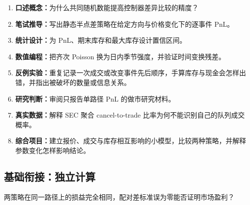 \begin{enumerate}[leftmargin=*]
  \item \textbf{口述概念：}为什么共同随机数能提高控制器差异比较的精度？
  \item \textbf{笔试推导：}写出静态半点差策略在给定方向与价格变化下的逐事件 PnL。
  \item \textbf{统计设计：}为 PnL、期末库存和最大库存设计置信区间。
  \item \textbf{数值编程：}把齐次 Poisson 换为日内季节强度，并验证时间变换残差。
  \item \textbf{反例实验：}重复记录一次成交或改变事件先后顺序，手算库存与现金会怎样出错，并指出被破坏的数量或信息关系。
  \item \textbf{研究判断：}审阅只报告单路径 PnL 的做市研究材料。
  \item \textbf{真实数据：}解释 SEC 聚合 cancel-to-trade 比率为何不能识别自己的队列成交概率。
  \item \textbf{综合项目：}建立报价、成交与库存相互影响的小模型，比较两种策略，并解释参数变化怎样影响结论。
\end{enumerate}

\subsection*{基础衔接：独立计算}
两策略在同一路径上的损益完全相同，配对差标准误为零能否证明市场盈利？
